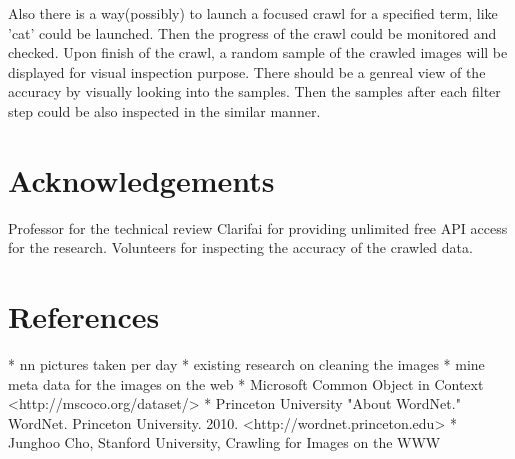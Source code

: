 \documentclass[paper=a4, fontsize=11pt]{scrartcl}
\numberwithin{equation}{section}		%
\numberwithin{figure}{section}			%
\numberwithin{table}{section}				%
\begin{document}
\begin{multicols}{2}
Also there is a way(possibly) to launch a focused crawl for a specified term, like 'cat' could be launched. Then the progress of the crawl could be monitored and checked.
Upon finish of the crawl, a random sample of the crawled images will be displayed for visual inspection purpose. There should be a genreal view of the accuracy by visually looking into the samples.
Then the samples after each filter step could be also inspected in the similar manner.

\section{Acknowledgements}

Professor for the technical review
Clarifai for providing unlimited free API access for the research.
Volunteers for inspecting the accuracy of the crawled data.

\end{multicols}
\section{References}


 * nn pictures taken per day
 * existing research on cleaning the images
 * mine meta data for the images on the web
 * Microsoft Common Object in Context <http://mscoco.org/dataset/>
 * Princeton University "About WordNet." WordNet. Princeton University. 2010. <http://wordnet.princeton.edu>
 * Junghoo Cho, Stanford University, Crawling for Images on the WWW
\end{document}
